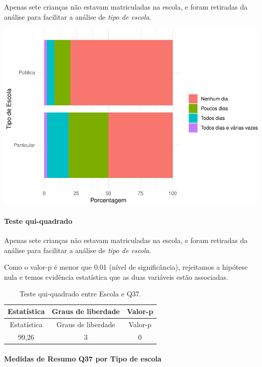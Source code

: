 \documentclass[]{article}
\let\oldparagraph\paragraph
\renewcommand{\paragraph}[1]{\oldparagraph{#1}\mbox{}}
\begin{document}
Apenas sete crianças não estavam matriculadas na escola, e foram retiradas da análise para facilitar a análise de \emph{tipo de escola}.

\begin{center}\includegraphics[width=0.75\linewidth]{relatorio_covid19_files/figure-latex/unnamed-chunk-1410-1} \end{center}

\hypertarget{teste-qui-quadrado-121}{%
\paragraph{Teste qui-quadrado}\label{teste-qui-quadrado-121}}

Apenas sete crianças não estavam matriculadas na escola, e foram retiradas da análise para facilitar a análise de \emph{tipo de escola}.

Como o valor-p é menor que 0.01 (nível de significância), rejeitamos a hipótese nula e temos evidência estatística que as duas variáveis estão associadas.

\begin{longtable}[]{@{}ccc@{}}
\caption{\label{tab:unnamed-chunk-1412}Teste qui-quadrado entre Escola e Q37.}\tabularnewline
\toprule
Estatística & Graus de liberdade & Valor-p\tabularnewline
\midrule
\endfirsthead
\toprule
Estatística & Graus de liberdade & Valor-p\tabularnewline
\midrule
\endhead
99,26 & 3 & 0\tabularnewline
\bottomrule
\end{longtable}

\cleardoublepage

\hypertarget{medidas-de-resumo-q37-por-tipo-de-escola}{%
\paragraph{Medidas de Resumo Q37 por Tipo de escola}\label{medidas-de-resumo-q37-por-tipo-de-escola}}
\end{document}
